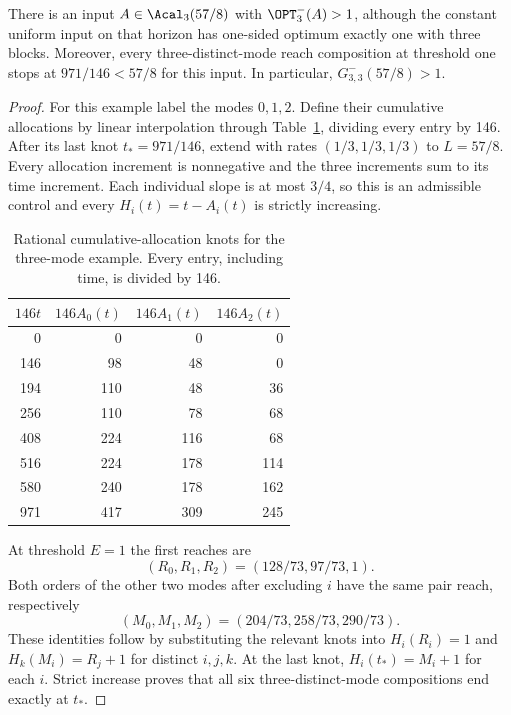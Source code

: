 \begin{proposition}[Failure at $k=n=3$]\label{prop:three-mode-failure}
There is an input $A\in\Acal_3(57/8)$ with
$\OPT^-_3(A)>1$, although the constant uniform input on that horizon
has one-sided optimum exactly one with three blocks. Moreover, every
three-distinct-mode reach composition at threshold one stops at
$971/146<57/8$ for this input. In particular,
$G^-_{3,3}(57/8)>1$.
\end{proposition}
\begin{proof}
For this example label the modes $0,1,2$. Define their cumulative
allocations by linear interpolation through Table~\ref{tab:n3-knots},
dividing every entry by 146. After its last knot $t_*=971/146$, extend
with rates $(1/3,1/3,1/3)$ to $L=57/8$. Every allocation increment is
nonnegative and the three increments sum to its time increment. Each
individual slope is at most $3/4$, so this is an admissible control and
every $H_i(t)=t-A_i(t)$ is strictly increasing.

\begin{table}[tb]
\centering
\begin{tabular}{rrrr}
\toprule
$146t$ & $146A_0(t)$ & $146A_1(t)$ & $146A_2(t)$\\
\midrule
0&0&0&0\\
146&98&48&0\\
194&110&48&36\\
256&110&78&68\\
408&224&116&68\\
516&224&178&114\\
580&240&178&162\\
971&417&309&245\\
\bottomrule
\end{tabular}
\caption{Rational cumulative-allocation knots for the three-mode example.
Every entry, including time, is divided by 146.}
\label{tab:n3-knots}
\end{table}

At threshold $E=1$ the first reaches are
\[
 (R_0,R_1,R_2)=(128/73,97/73,1).
\]
Both orders of the other two modes after excluding $i$ have the same
pair reach, respectively
\[
 (M_0,M_1,M_2)=(204/73,258/73,290/73).
\]
These identities follow by substituting the relevant knots into
$H_i(R_i)=1$ and $H_k(M_i)=R_j+1$ for distinct $i,j,k$.
At the last knot, $H_i(t_*)=M_i+1$ for each $i$. Strict increase proves
that all six three-distinct-mode compositions end exactly at $t_*$.


\end{proof}
